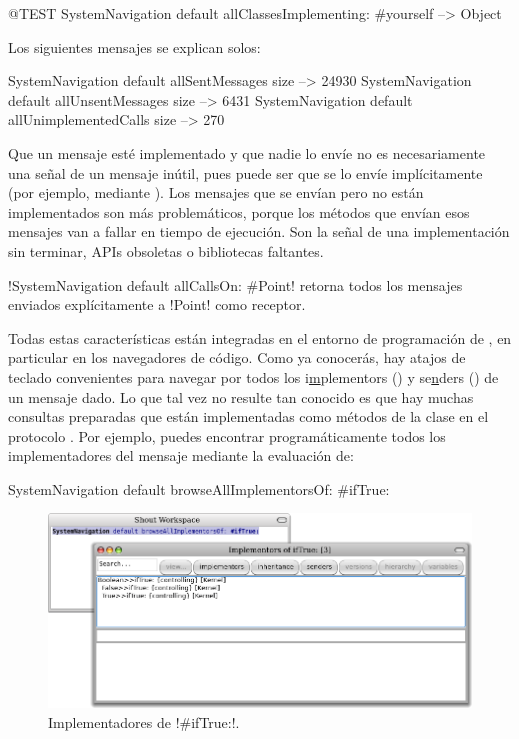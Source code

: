 \documentclass[a4paper,10pt,twoside]{book}
\begin{document}
\begin{code}{@TEST}
SystemNavigation default allClassesImplementing: #yourself --> {Object}
\end{code}

Los siguientes mensajes se explican solos:

\begin{code}{}
SystemNavigation default allSentMessages size          --> 24930
SystemNavigation default allUnsentMessages size      --> 6431
SystemNavigation default allUnimplementedCalls size --> 270
\end{code}

Que un mensaje est\'e implementado y que nadie lo env\'ie no es
necesariamente una señal de un mensaje in\'util, pues puede ser que se
lo env\'ie impl\'icitamente (por ejemplo, mediante ).  Los
mensajes que se env\'ian pero no est\'an implementados son m\'as
problem\'aticos, porque los m\'etodos que env\'ian esos mensajes van a
fallar en tiempo de ejecuci\'on.  Son la señal de una implementaci\'on sin
terminar, APIs obsoletas o bibliotecas faltantes.

\ct!SystemNavigation default allCallsOn: #Point! retorna todos los
mensajes enviados expl\'icitamente a \ct!Point! como receptor.

Todas estas caracter\'isticas est\'an integradas en el entorno de
programaci\'on de \pharo, en particular en los navegadores de c\'odigo.
Como ya conocer\'as, hay atajos de teclado convenientes para navegar por
todos los i\underline{m}plementors () y se\underline{n}ders
() de un mensaje dado.  Lo que tal vez no resulte tan
conocido es que hay muchas consultas preparadas que est\'an
implementadas como m\'etodos de la clase  en el
protocolo .  Por ejemplo, puedes encontrar
program\'aticamente todos los implementadores del mensaje 
mediante la evaluaci\'on de:
\begin{code}{}
SystemNavigation default browseAllImplementorsOf: #ifTrue:
\end{code}

\begin{figure}[ht]\centering
        \includegraphics[width=\linewidth]{implementors}
        \caption{Implementadores de \ct!\#ifTrue:!.}
\end{figure}
\end{document}
